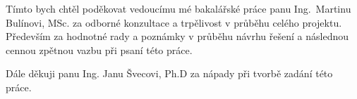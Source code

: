 
\begin{acknowledgements}
\vspace{1cm}
\vspace*{0.1\textheight}

Tímto bych chtěl poděkovat vedoucímu mé bakalářské práce panu \mbox{Ing. Martinu} Bulínovi, MSc. za odborné konzultace a trpělivost v průběhu celého projektu. Především za hodnotné rady a poznámky v průběhu návrhu řešení a následnou cennou zpětnou vazbu při psaní této práce. \par
Dále děkuji panu Ing. Janu Švecovi, Ph.D za nápady při tvorbě zadání této práce. \par

\end{acknowledgements}